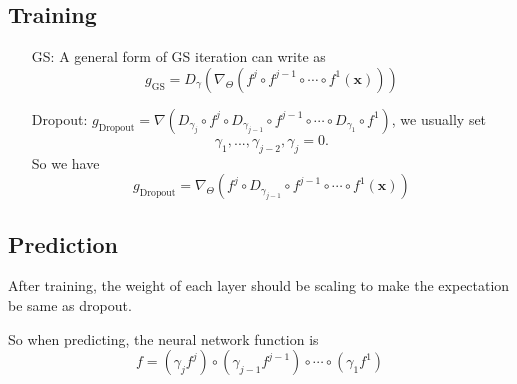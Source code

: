 \subsection{Training}
\begin{itemize}
	\item [GS:] A general form of GS iteration can write as $$g_{\text{GS}}=D_\gamma(\nabla_{\Theta} (f^j\circ f^{j-1}\circ \cdots \circ f^1(\mathbf x)))$$
	\item [Dropout:] $g_{\text{Dropout}}=\nabla( D_{\gamma_j}\circ f^j\circ D_{\gamma_{j-1}}\circ f^{j-1} \circ \cdots \circ D_{\gamma_1}\circ f^1 )$, we usually set $$\gamma_1,...,\gamma_{j-2},\gamma_j = 0.$$ So we have $$g_{\text{Dropout}}=\nabla_\Theta(  f^j\circ D_{\gamma_{j-1}}\circ f^{j-1} \circ \cdots \circ f^1(\mathbf x) )$$
	
\end{itemize}
\subsection{Prediction}
	After training, the weight of each layer should be scaling to make the expectation be same as dropout.
	
	So when predicting, the neural network function is
	$$
	f= (\gamma_j f^j)\circ (\gamma_{j-1} f^{j-1})\circ \cdots \circ( \gamma_1 f^1 )$$
